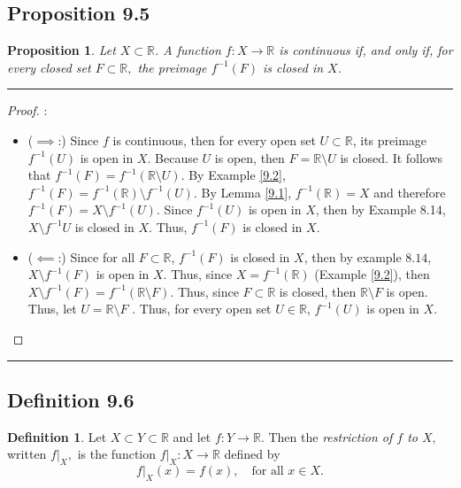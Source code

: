 \documentclass[openany, amssymb, psamsfonts]{amsart}
\newcommand{\bbR}{\mathbb{R}}
\newcommand{\sm}{\setminus}
\newcommand{\arr}{\longrightarrow}
\newtheorem{prop}{Proposition}[section]
\theoremstyle{definition}
\newtheorem{defn}{Definition}[section]
\numberwithin{equation}{section}
\begin{document}
\subsection*{Proposition 9.5}
\begin{prop} Let $X\subset \bbR$. A function  $f\colon X\arr \bbR$ is continuous if, and only if, for every closed set $F\subset \bbR,$ the preimage $f^{-1}(F)$ is closed in $X$.
\end{prop}\vspace{4pt}     \hrule   \vspace{4pt}
\begin{proof}:\\
    \begin{itemize}
        \item ($\implies$:) Since $f$ is continuous, then for every open set $U\subset \bbR$, its preimage $f^{-1}(U)$ is open in $X$. 
        Because $U$ is open, then $F = \bbR \sm U$ is closed. It follows that 
        $f^{-1}(F) = f^{-1}(\bbR \sm U)$. By Example \ref{9.2}, $f^{-1}(F) = f^{-1}(\bbR) \sm f^{-1}(U)$. By Lemma \ref{9.1}, $f^{-1}(\bbR) = X$ and therefore $f^{-1}(F) = X \sm f^{-1}(U)$. Since $f^{-1}(U)$ is open in $X$, then by Example 8.14, $X\sm f^{-1} U$ is closed in $X$. Thus, $f^{-1}(F)$ is closed in $X$.
        \item ($\impliedby$:) Since for all $F\subset \bbR$, $f^{-1}(F)$ is closed in $X$, then by example $8.14$, $X\sm f^{-1}(F)$ is open in $X$. Thus, since $X = f^{-1}(\bbR)$ (Example \ref{9.2}), then $X\sm f^{-1}(F) = f^{-1}(\bbR \sm F)$. Thus, since $F\subset \bbR$ is closed, then $\bbR \sm F$ is open. Thus, let $U = \bbR \sm F$ . Thus, for every open set $U\in \bbR$, $f^{-1}(U)$ is open in $X$.
    \end{itemize}
\end{proof}\vspace{4pt}     \hrule   \vspace{4pt}

\subsection*{Definition 9.6}
\begin{defn}
\label{9.6}
Let $X\subset Y\subset \bbR$ and let $f:Y\longrightarrow \bbR.$ Then the {\em restriction of $f$ to $X,$} written $f|_X,$ is the function
$f|_X : X\longrightarrow \bbR$ defined by 
$$f|_X (x)=f(x),\quad \text{for all }x\in X.$$
\end{defn} 
\end{document}
